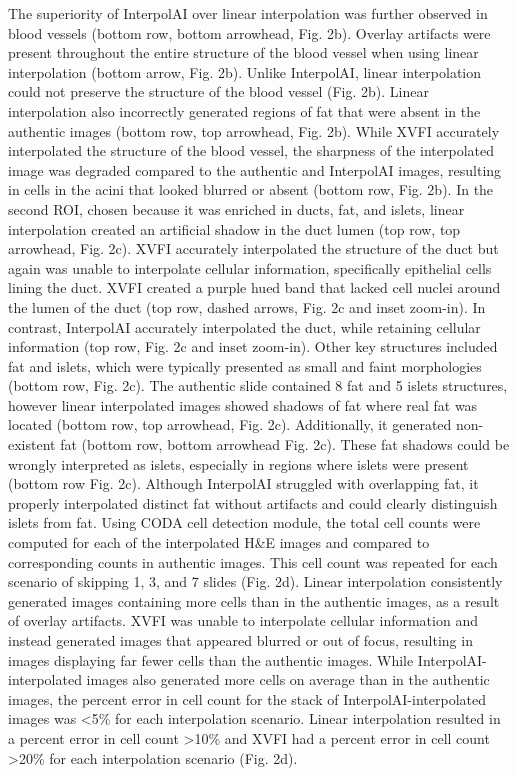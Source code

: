 \begin{refsection}
    The superiority of InterpolAI over linear interpolation was further observed in blood vessels (bottom row, bottom arrowhead, Fig. 2b). Overlay artifacts were present throughout the entire structure of the blood vessel when using linear interpolation (bottom arrow, Fig. 2b). Unlike InterpolAI, linear interpolation could not preserve the structure of the blood vessel (Fig. 2b). Linear interpolation also incorrectly generated regions of fat that were absent in the authentic images (bottom row, top arrowhead, Fig. 2b). While XVFI accurately interpolated the structure of the blood vessel, the sharpness of the interpolated image was degraded compared to the authentic and InterpolAI images, resulting in cells in the acini that looked blurred or absent (bottom row, Fig. 2b). 
    In the second ROI, chosen because it was enriched in ducts, fat, and islets, linear interpolation created an artificial shadow in the duct lumen (top row, top arrowhead, Fig. 2c). XVFI accurately interpolated the structure of the duct but again was unable to interpolate cellular information, specifically epithelial cells lining the duct.  XVFI created a purple hued band that lacked cell nuclei around the lumen of the duct (top row, dashed arrows, Fig. 2c and inset zoom-in).  In contrast, InterpolAI accurately interpolated the duct, while retaining cellular information (top row, Fig. 2c and inset zoom-in). Other key structures included fat and islets, which were typically presented as small and faint morphologies (bottom row, Fig. 2c). The authentic slide contained 8 fat and 5 islets structures, however linear interpolated images showed shadows of fat where real fat was located (bottom row, top arrowhead, Fig. 2c). Additionally, it generated non-existent fat (bottom row, bottom arrowhead Fig. 2c). These fat shadows could be wrongly interpreted as islets, especially in regions where islets were present (bottom row Fig. 2c). Although InterpolAI struggled with overlapping fat, it properly interpolated distinct fat without artifacts and could clearly distinguish islets from fat.
    Using CODA cell detection module, the total cell counts were computed for each of the interpolated H\&E images and compared to corresponding counts in authentic images. This cell count was repeated for each scenario of skipping 1, 3, and 7 slides (Fig. 2d). Linear interpolation consistently generated images containing more cells than in the authentic images, as a result of overlay artifacts. XVFI was unable to interpolate cellular information and instead generated images that appeared blurred or out of focus, resulting in images displaying far fewer cells than the authentic images. While InterpolAI-interpolated images also generated more cells on average than in the authentic images, the percent error in cell count for the stack of InterpolAI-interpolated images was <5\% for each interpolation scenario. Linear interpolation resulted in a percent error in cell count >10\% and XVFI had a percent error in cell count >20\% for each interpolation scenario (Fig. 2d). 

\end{refsection}
